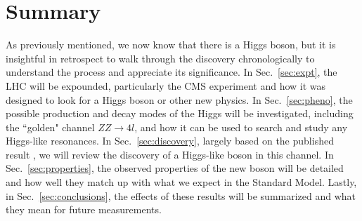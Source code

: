 \section{Summary}
\label{sec:intro_summary}

As previously mentioned, we now know that there is a Higgs boson, but it is insightful in retrospect to walk through the discovery chronologically to understand the process and appreciate its significance. In Sec.~\ref{sec:expt}, the LHC will be expounded, particularly the CMS experiment and how it was designed to look for a Higgs boson or other new physics. In Sec.~\ref{sec:pheno}, the possible production and decay modes of the Higgs will be investigated, including the ``golden" channel $ZZ\rightarrow 4l$, and how it can be used to search and study any Higgs-like resonances. In Sec.~\ref{sec:discovery}, largely based on the published result \cite{}, we will review the discovery of a Higgs-like boson in this channel. In Sec.~\ref{sec:properties}, the observed properties of the new boson will be detailed and how well they match up with what we expect in the Standard Model. Lastly, in Sec.~\ref{sec:conclusions}, the effects of these results will be summarized and what they mean for future measurements.